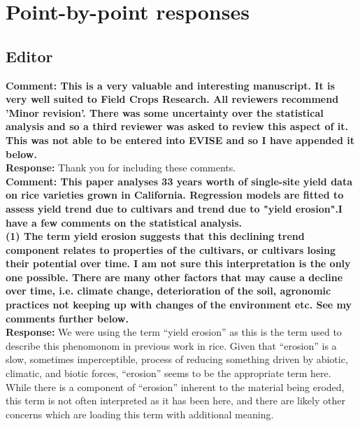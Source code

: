 \documentclass{article} \usepackage[margin=1in]{geometry}
\begin{document}


\newpage

\section{Point-by-point responses}


\subsection{Editor}

\textbf{Comment: This is a very valuable and interesting manuscript.  It is very well
  suited to Field Crops Research.  All reviewers recommend 'Minor
  revision'.  There was some uncertainty over the statistical analysis
  and so a third reviewer was asked to review this aspect of it. This
  was not able to be entered into EVISE and so I have appended it below.}\\

\textbf{Response:} Thank you for including these comments. \\

\textbf{Comment: This paper analyses 33 years worth of single-site yield data on rice
  varieties grown in California. Regression models are fitted to assess
  yield trend due to cultivars and trend due to "yield erosion".I have a
  few comments on the statistical analysis.}\\

\textbf{(1) The term yield erosion suggests that this declining trend
  component relates to properties of the cultivars, or cultivars losing
  their potential over time. I am not sure this interpretation is the
  only one possible. There are many other factors that may cause a
  decline over time, i.e. climate change, deterioration of the soil,
  agronomic practices not keeping up with changes of the environment
  etc. See my comments further below.}\\

\textbf{Response:} We were using the term ``yield erosion'' as this is
the term used to describe this phenomonom in previous work in
rice. Given that ``erosion'' is a slow, sometimes
imperceptible, process of reducing something
driven by abiotic, climatic, and biotic forces, ``erosion'' seems to
be the appropriate term here. While there is a component of ``erosion'' inherent
to the material being eroded, this term is not often interpreted as it
has been here, and there are likely other concerns which are loading
this term with additional meaning.
\end{document}
